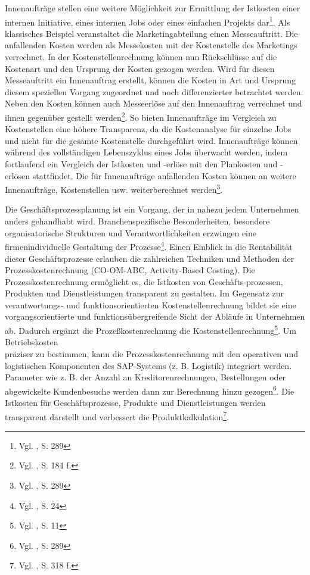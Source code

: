 Innenaufträge stellen eine weitere Möglichkeit zur Ermittlung der Istkosten einer internen Initiative, eines internen Jobs oder eines einfachen Projekts dar\footnote{Vgl. \cite{Patel2009}, S. 289}. Als klassisches Beispiel veranstaltet die Marketingabteilung einen Messeauftritt. Die anfallenden Kosten werden als Messekosten mit der Kostenstelle des Marketings verrechnet. In der Kostenstellenrechnung können nun Rückschlüsse auf die Kostenart und den Ursprung der Kosten gezogen werden. Wird für diesen Messeauftritt ein Innenauftrag erstellt, können die Kosten in Art und Ursprung diesem speziellen Vorgang zugeordnet und noch differenzierter betrachtet werden. Neben den Kosten können auch Messeerlöse auf den Innenauftrag verrechnet und ihnen gegenüber gestellt werden\footnote{Vgl. \cite{Klein2010}, S. 184 f.}. 
So bieten Innenaufträge im Vergleich zu Kostenstellen eine höhere Transparenz, da die Kostenanalyse für einzelne Jobs und nicht für die gesamte Kostenstelle durchgeführt wird. Innenaufträge können während des vollständigen Lebenszyklus eines Jobs überwacht werden, indem fortlaufend ein Vergleich der Istkosten und -erlöse mit den Plankosten und -erlösen stattfindet. Die für Innenaufträge anfallenden Kosten können an weitere Innenaufträge, Kostenstellen usw. weiterberechnet werden\footnote{Vgl. \cite{Patel2009}, S. 289}.

Die Geschäftsprozessplanung ist ein Vorgang, der in nahezu jedem Unternehmen anders gehandhabt wird. Branchenspezifische Besonderheiten, besondere organisatorische Strukturen und Verantwortlichkeiten erzwingen eine firmenindividuelle Gestaltung der Prozesse\footnote{Vgl. \cite{Friedl2008}, S. 24}. Einen Einblick in die Rentabilität dieser Geschäftsprozesse erlauben die zahlreichen Techniken und Methoden der Prozesskostenrechnung (CO-OM-ABC, Activity-Based Costing). Die Prozesskostenrechnung ermöglicht es, die Istkosten von Geschäfts-prozessen, Produkten und Dienstleistungen transparent zu gestalten. Im Gegensatz zur verantwortungs- und funktionsorientierten Kostenstellenrechnung bildet sie eine vorgangsorientierte und funktionsübergreifende Sicht der Abläufe in Unternehmen ab. Dadurch ergänzt die Prozeßkostenrechnung die Kostenstellenrechnung\footnote{Vgl. \cite{SAPCOOMABC2001}, S. 11}. 
Um Betriebskosten \\präziser zu bestimmen, kann die Prozesskostenrechnung mit den operativen und logistischen Komponenten des SAP-Systems (z. B. Logistik) integriert werden. Parameter wie z. B. der Anzahl an Kreditorenrechnungen, Bestellungen oder abgewickelte Kundenbesuche werden dann zur Berechnung hinzu gezogen\footnote{Vgl. \cite{Patel2009}, S. 289}. 
Die Istkosten für Geschäftsprozesse, Produkte und Dienstleistungen werden transparent darstellt und verbessert die Produktkalkulation\footnote{Vgl. \cite{Patel2009}, S. 318 f.}.


